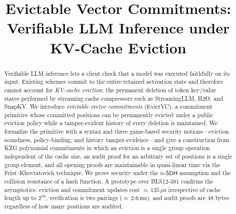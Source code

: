 \documentclass[version=submission]{iacrcc}
\title[running = {Evictable Vector Commitments}]{Evictable Vector Commitments: Verifiable LLM Inference under KV-Cache Eviction}
\theoremstyle{definition}
\newcommand{\nsdh}{n\text{-}\mathsf{SDH}}
\begin{document}
\maketitle


\begin{abstract}
Verifiable LLM inference lets a client check that a model was executed
faithfully on its input. Existing schemes commit to the entire retained
activation state and therefore cannot account for \emph{KV-cache eviction}:
the permanent deletion of token key/value states performed by streaming cache
compressors such as StreamingLLM, H2O, and SnapKV. We introduce
\emph{evictable vector commitments} (EvictVC), a commitment primitive whose
committed positions can be permanently evicted under a public eviction policy
while a tamper-evident history of every deletion is maintained. We formalize
the primitive with a syntax and three game-based security notions---eviction
soundness, policy-binding, and history tamper-evidence---and give a
construction from KZG polynomial commitments in which an eviction is a single
group operation independent of the cache size, an audit proof for an arbitrary
set of positions is a single group element, and all opening proofs are
maintainable in quasi-linear time via the Feist--Khovratovich technique. We
prove security under the $\nsdh$ assumption and the collision resistance of a
hash function. A prototype over BLS12-381 confirms the asymptotics: eviction and
commitment updates cost ${\approx}\,135\,\mu\mathrm{s}$ irrespective of cache
length up to $2^{16}$, verification is two pairings
(${\approx}\,2.6\,\mathrm{ms}$), and audit proofs are $48$ bytes regardless of
how many positions are audited.
\end{abstract}
\end{document}
